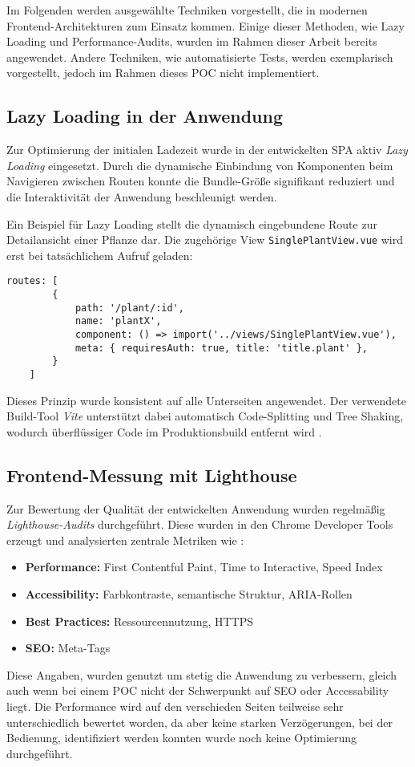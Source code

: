 Im Folgenden werden ausgewählte Techniken vorgestellt, die in modernen Frontend-Architekturen zum Einsatz kommen. Einige dieser Methoden, wie Lazy Loading und Performance-Audits, wurden im Rahmen dieser Arbeit bereits angewendet. Andere Techniken, wie automatisierte Tests, werden exemplarisch vorgestellt, jedoch im Rahmen dieses \ac{POC} nicht implementiert.

\subsection{Lazy Loading in der Anwendung}

Zur Optimierung der initialen Ladezeit wurde in der entwickelten \ac{SPA} aktiv \emph{Lazy Loading} eingesetzt. Durch die dynamische Einbindung von Komponenten beim Navigieren zwischen Routen konnte die Bundle-Größe signifikant reduziert und die Interaktivität der Anwendung beschleunigt werden. 

Ein Beispiel für Lazy Loading stellt die dynamisch eingebundene Route zur Detailansicht einer Pflanze dar. Die zugehörige View \texttt{SinglePlantView.vue} wird erst bei tatsächlichem Aufruf geladen:

\begin{lstlisting}[caption=Lazy Loading per Route in Vue Router]
	routes: [
		{
			path: '/plant/:id',
			name: 'plantX',
			component: () => import('../views/SinglePlantView.vue'),
			meta: { requiresAuth: true, title: 'title.plant' },
		}
	]
\end{lstlisting}

Dieses Prinzip wurde konsistent auf alle Unterseiten angewendet. Der verwendete Build-Tool \emph{Vite} unterstützt dabei automatisch Code-Splitting und Tree Shaking, wodurch überflüssiger Code im Produktionsbuild entfernt wird \cite{ViteDocs2024,RollupDocs2024}.

\subsection{Frontend-Messung mit Lighthouse}

Zur Bewertung der Qualität der entwickelten Anwendung wurden regelmäßig \emph{Lighthouse-Audits} durchgeführt. Diese wurden in den Chrome Developer Tools erzeugt und analysierten zentrale Metriken wie \cite{GoogleLighthouse2024}:

\begin{itemize}
	\item \textbf{Performance:} First Contentful Paint, Time to Interactive, Speed Index
	\item \textbf{Accessibility:} Farbkontraste, semantische Struktur, ARIA-Rollen
	\item \textbf{Best Practices:} Ressourcennutzung, HTTPS
	\item  \textbf{SEO:}  Meta-Tags
\end{itemize}

Diese Angaben, wurden genutzt um stetig die Anwendung zu verbessern, gleich auch wenn bei einem \ac{POC} nicht der Schwerpunkt auf \ac{SEO} oder Accessability liegt. Die Performance wird auf den verschieden Seiten teilweise sehr unterschiedlich bewertet worden, da aber keine starken Verzögerungen, bei der Bedienung, identifiziert werden konnten wurde noch keine Optimierung durchgeführt.